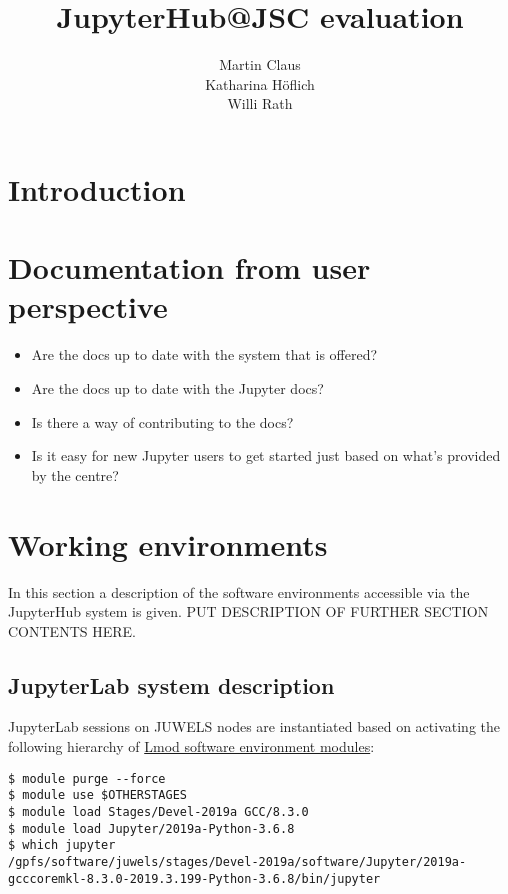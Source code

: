 \documentclass[11pt,a4paper]{article}
\title{\textbf{JupyterHub@JSC evaluation}}
\author{
  Martin Claus \\ %
	Katharina Höflich \\
	Willi Rath}
\begin{document}
\maketitle
\tableofcontents


%

\section{Introduction}
\label{s-introductoin}


\section{Documentation from user perspective}
\label{s-doc-from-user-pov}

\begin{itemize}
	\item Are the docs up to date with the system that is offered?
	\item Are the docs up to date with the Jupyter docs?
	\item Is there a way of contributing to the docs?
	\item Is it easy for new Jupyter users to get started just based on what's provided by the centre?
\end{itemize}

\citet{Lorem2020a} %
\section{Working environments}
\label{sect:working-envs}

In this section a description of the software environments accessible via the JupyterHub system is given.
PUT DESCRIPTION OF FURTHER SECTION CONTENTS HERE.

\subsection{JupyterLab system description}
\label{sect:system-description}

JupyterLab sessions on JUWELS nodes are instantiated based on activating the following hierarchy of \href{https://lmod.readthedocs.io/en/latest/index.html}{Lmod software environment modules}:
%
\begin{verbatim}
$ module purge --force
$ module use $OTHERSTAGES
$ module load Stages/Devel-2019a GCC/8.3.0
$ module load Jupyter/2019a-Python-3.6.8
$ which jupyter
/gpfs/software/juwels/stages/Devel-2019a/software/Jupyter/2019a-gcccoremkl-8.3.0-2019.3.199-Python-3.6.8/bin/jupyter
\end{verbatim}
\end{document}
